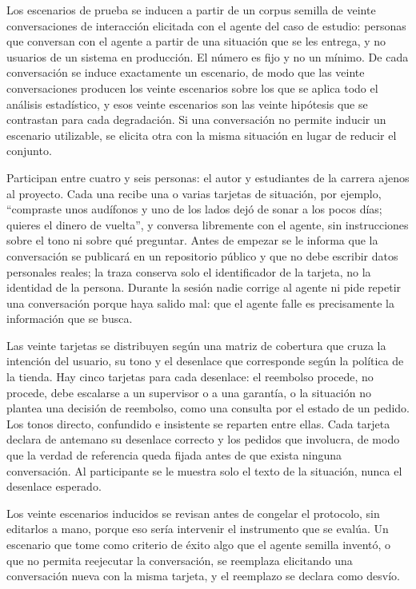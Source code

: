 Los escenarios de prueba se inducen a partir de un corpus semilla de veinte conversaciones de interacción elicitada con el agente del caso de estudio: personas que conversan con el agente a partir de una situación que se les entrega, y no usuarios de un sistema en producción. El número es fijo y no un mínimo. De cada conversación se induce exactamente un escenario, de modo que las veinte conversaciones producen los veinte escenarios sobre los que se aplica todo el análisis estadístico, y esos veinte escenarios son las veinte hipótesis que se contrastan para cada degradación. Si una conversación no permite inducir un escenario utilizable, se elicita otra con la misma situación en lugar de reducir el conjunto.
\par
Participan entre cuatro y seis personas: el autor y estudiantes de la carrera ajenos al proyecto. Cada una recibe una o varias tarjetas de situación, por ejemplo, ``compraste unos audífonos y uno de los lados dejó de sonar a los pocos días; quieres el dinero de vuelta'', y conversa libremente con el agente, sin instrucciones sobre el tono ni sobre qué preguntar. Antes de empezar se le informa que la conversación se publicará en un repositorio público y que no debe escribir datos personales reales; la traza conserva solo el identificador de la tarjeta, no la identidad de la persona. Durante la sesión nadie corrige al agente ni pide repetir una conversación porque haya salido mal: que el agente falle es precisamente la información que se busca.
\par
Las veinte tarjetas se distribuyen según una matriz de cobertura que cruza la intención del usuario, su tono y el desenlace que corresponde según la política de la tienda. Hay cinco tarjetas para cada desenlace: el reembolso procede, no procede, debe escalarse a un supervisor o a una garantía, o la situación no plantea una decisión de reembolso, como una consulta por el estado de un pedido. Los tonos directo, confundido e insistente se reparten entre ellas. Cada tarjeta declara de antemano su desenlace correcto y los pedidos que involucra, de modo que la verdad de referencia queda fijada antes de que exista ninguna conversación. Al participante se le muestra solo el texto de la situación, nunca el desenlace esperado.
\par
Los veinte escenarios inducidos se revisan antes de congelar el protocolo, sin editarlos a mano, porque eso sería intervenir el instrumento que se evalúa. Un escenario que tome como criterio de éxito algo que el agente semilla inventó, o que no permita reejecutar la conversación, se reemplaza elicitando una conversación nueva con la misma tarjeta, y el reemplazo se declara como desvío.
\par

